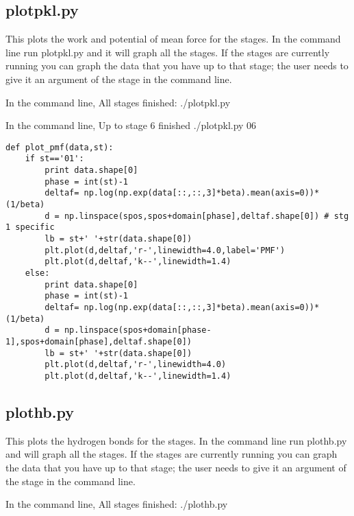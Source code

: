 \documentclass[11pt]{article}
\begin{document}
\subsection{plotpkl.py}
This plots the work and potential of mean force for the stages. In the command line run plotpkl.py and it will graph all the stages. If the stages are currently running you can graph the data that you have up to that stage; the user needs to give it an argument of the stage in the command line.

In the command line, All stages finished:
./plotpkl.py

In the command line, Up to stage 6 finished
./plotpkl.py 06


\begin{verbatim}
def plot_pmf(data,st):
    if st=='01':
        print data.shape[0]
        phase = int(st)-1
        deltaf= np.log(np.exp(data[::,::,3]*beta).mean(axis=0))*(1/beta)
        d = np.linspace(spos,spos+domain[phase],deltaf.shape[0]) # stg 1 specific
        lb = st+' '+str(data.shape[0])
        plt.plot(d,deltaf,'r-',linewidth=4.0,label='PMF')
        plt.plot(d,deltaf,'k--',linewidth=1.4)
    else:
        print data.shape[0]
        phase = int(st)-1
        deltaf= np.log(np.exp(data[::,::,3]*beta).mean(axis=0))*(1/beta)
        d = np.linspace(spos+domain[phase-1],spos+domain[phase],deltaf.shape[0])
        lb = st+' '+str(data.shape[0])
        plt.plot(d,deltaf,'r-',linewidth=4.0)
        plt.plot(d,deltaf,'k--',linewidth=1.4)
\end{verbatim}


\subsection{plothb.py}
This plots the hydrogen bonds for the stages. In the command line run plothb.py and will graph all the stages. If the stages are currently running you can graph the data that you have up to that stage; the user needs to give it an argument of the stage in the command line.

In the command line, All stages finished:
./plothb.py
\end{document}
